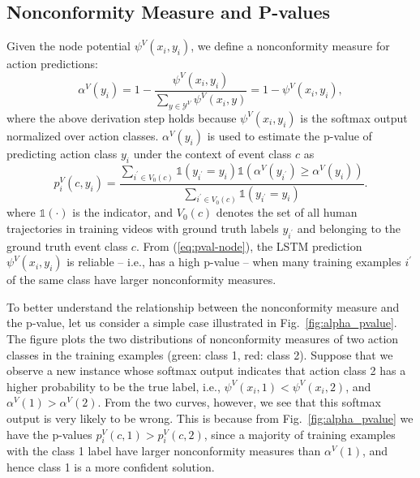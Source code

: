 \documentclass[10pt,twocolumn,letterpaper]{article}
\begin{document}
\subsection{Nonconformity Measure and P-values }


Given the node potential $\psi^V(x_i,y_i)$, we define a nonconformity measure for action predictions:
\begin{equation}
\alpha^V(y_i) =  1 - \frac{\psi^V(x_i,y_i)}{\sum_{y \in \mathcal{Y}^V} \psi^V(x_i,y)} = 1 - \psi^V(x_i,y_i),
\label{eq:alphan}
\end{equation}
where the above derivation step holds because $\psi^V(x_i,y_i)$ is the softmax output normalized over action classes. $\alpha^V(y_i) $ is used to estimate the p-value of predicting action class $y_i$ under the context of event class $c$ as
\begin{equation}
p_i^V(c, y_i) =  \frac{\sum_{{i^\prime} \in V_0(c)} \mathds{1}(y_{i^\prime} = y_i) \mathds{1}(\alpha^V(y_{i^\prime}) \geq \alpha^V(y_i))}{\sum_{{i^\prime} \in V_0(c)} \mathds{1}(y_{i^\prime} = y_i)}.
\label{eq:pval-node}
\end{equation}
where $\mathds{1}(\cdot)$ is the indicator, and $V_0(c)$ denotes the set of all human trajectories in training videos with ground truth labels $y_{i^\prime}$ and belonging to the ground truth event class $c$. From (\ref{eq:pval-node}), the LSTM prediction $\psi^V(x_i,y_i)$ is reliable -- i.e., has a high p-value -- when many training examples $i^\prime$ of the same class have larger nonconformity measures.%

To better understand the relationship between the nonconformity measure and the p-value, let us consider a simple case illustrated in Fig.~\ref{fig:alpha_pvalue}. The figure plots the two distributions of nonconformity measures of two action classes in the training examples (green: class 1, red: class 2). Suppose that we observe a new instance whose softmax output indicates that action class 2 has a higher probability to be the true label, i.e., $\psi^V(x_i, 1) < \psi^V(x_i, 2)$, and $\alpha^V(1) > \alpha^V(2)$. From the two curves, however, we see that this softmax output is very likely to be wrong. This is because from Fig.~\ref{fig:alpha_pvalue} we have the p-values $p_i^V(c,1) > p_i^V(c,2)$, since a majority of training examples with the class 1 label have larger nonconformity measures than $\alpha^V(1)$, and hence class 1 is a more confident solution.
\end{document}
